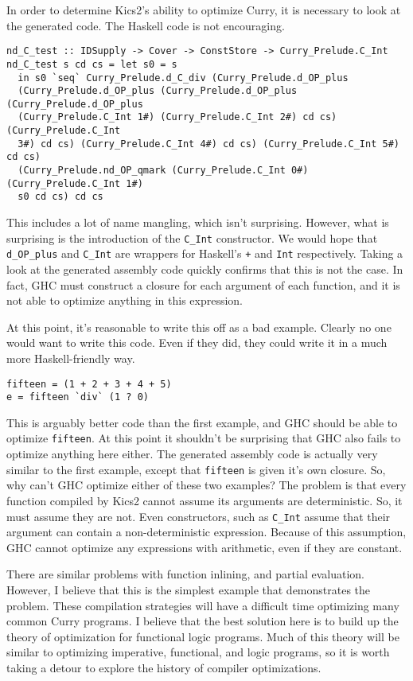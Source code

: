 In order to determine Kics2's ability to optimize Curry, it is necessary to look at the generated code.
The Haskell code is not encouraging.

\begin{verbatim}
nd_C_test :: IDSupply -> Cover -> ConstStore -> Curry_Prelude.C_Int
nd_C_test s cd cs = let s0 = s
  in s0 `seq` Curry_Prelude.d_C_div (Curry_Prelude.d_OP_plus
  (Curry_Prelude.d_OP_plus (Curry_Prelude.d_OP_plus (Curry_Prelude.d_OP_plus
  (Curry_Prelude.C_Int 1#) (Curry_Prelude.C_Int 2#) cd cs) (Curry_Prelude.C_Int
  3#) cd cs) (Curry_Prelude.C_Int 4#) cd cs) (Curry_Prelude.C_Int 5#) cd cs)
  (Curry_Prelude.nd_OP_qmark (Curry_Prelude.C_Int 0#) (Curry_Prelude.C_Int 1#)
  s0 cd cs) cd cs
\end{verbatim}

This includes a lot of name mangling, which isn't surprising.
However, what is surprising is the introduction of the \texttt{C\_Int} constructor.
We would hope that \texttt{d\_OP\_plus} and \texttt{C\_Int} 
are wrappers for Haskell's \texttt{+} and \texttt{Int} respectively.
Taking a look at the generated assembly code quickly confirms that this is not the case.
In fact, GHC must construct a closure for each argument of each function, and it is not able to optimize anything in this expression.

At this point, it's reasonable to write this off as a bad example.  Clearly no one would want to write this code.
Even if they did, they could write it in a much more Haskell-friendly way.

\begin{verbatim}
fifteen = (1 + 2 + 3 + 4 + 5)
e = fifteen `div` (1 ? 0)
\end{verbatim}

This is arguably better code than the first example, and GHC should be able to optimize \texttt{fifteen}.
At this point it shouldn't be surprising that GHC also fails to optimize anything here either.
The generated assembly code is actually very similar to the first example, except that \texttt{fifteen}
is given it's own closure.
So, why can't GHC optimize either of these two examples?
The problem is that every function compiled by Kics2 cannot assume its arguments are deterministic.
So, it must assume they are not.
Even constructors, such as \texttt{C\_Int} assume that their argument can contain a non-deterministic expression.
Because of this assumption, GHC cannot optimize any expressions with arithmetic, even if they are constant.

There are similar problems with function inlining, and partial evaluation.
However, I believe that this is the simplest example that demonstrates the problem.
These compilation strategies will have a difficult time optimizing many common Curry programs.
I believe that the best solution here is to build up the theory of optimization for functional logic programs.
Much of this theory will be similar to optimizing imperative, functional, and logic programs,
so it is worth taking a detour to explore the history of compiler optimizations.

